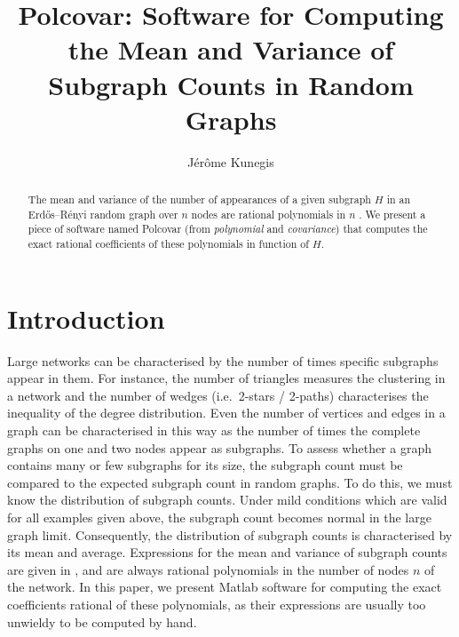 \documentclass{article}
\title{ 
  Polcovar:  
  Software for Computing the Mean and Variance of Subgraph Counts
  in Random Graphs
}
\begin{document}
\author{ Jérôme Kunegis }
\maketitle

\begin{abstract}
The mean and variance of the number of appearances of a given subgraph $H$
in an Erdős--Rényi random graph over $n$ nodes are rational polynomials
in $n$ \cite{gp6}.   
We present a piece of software named Polcovar (from \emph{polynomial}
and \emph{covariance}) that computes the exact rational coefficients of
these polynomials in function of $H$.  
\end{abstract}

\section{Introduction}
Large networks can be characterised by the number of times specific
subgraphs appear in them.  For instance, the number of triangles
measures the clustering in a network and the number of wedges
(i.e.\ 2-stars / 2-paths) characterises the inequality of the degree
distribution.  Even the number of vertices and edges in a graph can be
characterised in this way as the number of times the complete graphs on
one and two nodes appear as subgraphs.  To assess whether a graph
contains many or few subgraphs for its size, the subgraph count must be
compared to the expected subgraph count in random graphs.  To do this,
we must know the distribution of subgraph counts.  Under mild conditions
which are valid for all examples given above, the subgraph count becomes
normal in the large graph limit.  Consequently, the distribution of
subgraph counts is characterised by its mean and average.  Expressions
for the mean and variance of subgraph counts are given in \cite{gp6},
and are always rational polynomials in the number of nodes $n$ of the network.
In this paper, we present Matlab software for computing the exact
coefficients rational
of these polynomials, as their expressions are usually too unwieldy to
be computed by hand. 
\end{document}
